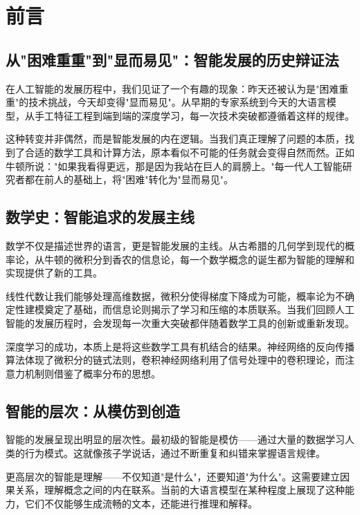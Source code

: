 
\chapter{ 前言}

\section{从"困难重重"到"显而易见"：智能发展的历史辩证法}

在人工智能的发展历程中，我们见证了一个有趣的现象：昨天还被认为是"困难重重"的技术挑战，今天却变得"显而易见"。从早期的专家系统到今天的大语言模型，从手工特征工程到端到端的深度学习，每一次技术突破都遵循着这样的规律。

这种转变并非偶然，而是智能发展的内在逻辑。当我们真正理解了问题的本质，找到了合适的数学工具和计算方法，原本看似不可能的任务就会变得自然而然。正如牛顿所说："如果我看得更远，那是因为我站在巨人的肩膀上。"每一代人工智能研究者都在前人的基础上，将"困难"转化为"显而易见"。

\section{数学史：智能追求的发展主线}

数学不仅是描述世界的语言，更是智能发展的主线。从古希腊的几何学到现代的概率论，从牛顿的微积分到香农的信息论，每一个数学概念的诞生都为智能的理解和实现提供了新的工具。

线性代数让我们能够处理高维数据，微积分使得梯度下降成为可能，概率论为不确定性建模奠定了基础，而信息论则揭示了学习和压缩的本质联系。当我们回顾人工智能的发展历程时，会发现每一次重大突破都伴随着数学工具的创新或重新发现。

深度学习的成功，本质上是将这些数学工具有机结合的结果。神经网络的反向传播算法体现了微积分的链式法则，卷积神经网络利用了信号处理中的卷积理论，而注意力机制则借鉴了概率分布的思想。

\section{智能的层次：从模仿到创造}

智能的发展呈现出明显的层次性。最初级的智能是模仿——通过大量的数据学习人类的行为模式。这就像孩子学说话，通过不断重复和纠错来掌握语言规律。

更高层次的智能是理解——不仅知道"是什么"，还要知道"为什么"。这需要建立因果关系，理解概念之间的内在联系。当前的大语言模型在某种程度上展现了这种能力，它们不仅能够生成流畅的文本，还能进行推理和解释。


